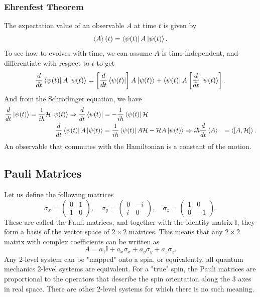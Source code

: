 \documentclass{article}
\begin{document}
\subsubsection{Ehrenfest Theorem}
The expectation value of an observable $A$ at time $t$ is given by
\[
    \left\langle A \right\rangle (t)=\bra{\psi (t)}A \ket{\psi (t)}.
\]
To see how to evolves with time, we can assume $A$ is time-independent, and differentiate with respect to $t$ to get
\[
    \frac{d }{d t}\bra{\psi (t)}A \ket{\psi (t)}=\left[ \frac{d }{d t}\bra{\psi (t)} \right]A \ket{\psi (t)}+ \bra{\psi (t)}A \left[ \frac{d }{d t} \ket{\psi (t)} \right].
\]
And from the Schr\"odinger equation, we have
\begin{align*}
    \frac{d }{d t}\ket{\psi (t)} = \frac{1}{i \hbar}\mathcal{H}\ket{\psi (t)}
    \Rightarrow \frac{d }{d t}\bra{\psi (t)}&= -\frac{1}{i \hbar}\bra{\psi (t)}\mathcal{H} \\
    \frac{d }{d t}\bra{\psi (t)}A \ket{\psi (t)} &=\frac{1}{i \hbar}\bra{\psi (t)}A \mathcal{H}-\mathcal{H}A \ket{\psi (t)}
    \Rightarrow i \hbar \frac{d }{d t}\left\langle A \right\rangle &=\left\langle \left[ A,\mathcal{H} \right] \right\rangle .
\end{align*}
An observable that commutes with the Hamiltonian is a constant of the motion. 

\subsection{Pauli Matrices}
Let us define the following matrices
\[
    \sigma _x=\begin{pmatrix}
        0 & 1 \\ 1 & 0
    \end{pmatrix},\quad\sigma _y=\begin{pmatrix}
        0 & -i \\ i & 0
    \end{pmatrix},\quad\sigma _z=\begin{pmatrix}
        1 & 0 \\ 0 & -1
    \end{pmatrix}.
\]
These are called the Pauli matrices, and together with the identity matrix $\mathbb{I}$, they form a basis of the vector space of $2\times 2$ matrices. This means that any $2\times 2$ matrix with complex coefficients can be written as
\[
    A=a_1 \mathbb{I}+a_x\sigma _x+a_y\sigma _y+a_z\sigma _z.
\]
Any 2-level system can be "mapped" onto a spin, or equivalently, all quantum mechanics 2-level systems are equivalent. For a "true" spin, the Pauli matrices are proportional to the operators that describe the spin orientation along the 3 axes in real space. There are other 2-level systems for which there is no such meaning.
\end{document}
